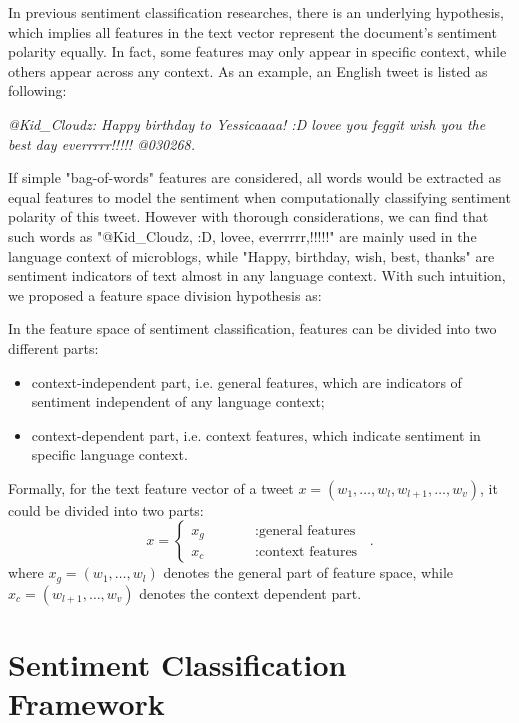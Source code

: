 \documentclass{llncs}
\begin{document}
In previous sentiment classification researches, there is an underlying hypothesis, which implies all features in the text vector represent the document’s sentiment polarity equally. 
In fact, some features may only appear in specific context, while others appear across any context. 
As an example, an English tweet is listed as following:

\textit{@Kid\_Cloudz: Happy birthday to Yessicaaaa! :D lovee you feggit wish you the best day everrrrr!!!!! @030268.}

If simple "bag-of-words" features are considered, all words would be extracted as equal features to model the sentiment when computationally classifying sentiment polarity of this tweet. 
However with thorough considerations, we can find that such words as "@Kid\_Cloudz, :D, lovee, everrrrr,!!!!!" are mainly used in the  language context of microblogs, while "Happy, birthday, wish, best, thanks" are sentiment indicators of text almost in any language context. 
With such intuition, we proposed a feature space division hypothesis as:
\begin{hypothesis}
\label{h1}
In the feature space of sentiment classification, features can be divided into two different parts:
\begin{itemize}
\item context-independent part, i.e. general features, which are indicators of sentiment independent of any language context;
\item context-dependent part, i.e. context features, which indicate sentiment in specific language context.
\end{itemize}
\end{hypothesis}
Formally, for the text feature vector of a tweet $ x=\left(  w_{1},\dots,w_{l},w_{l+1},\dots,w_{v} \right) $, it could be divided into two parts:
\begin{equation}
\label{e2}
x=\left\{
\begin{array}{rcl}
x_{g}     & \qquad        &:\mbox{general features}\\
x_{c}     &  \qquad       &:\mbox{context features}
\end{array}
\right. \enspace .
\end{equation}
where $ x_{g}= \left( w_{1},\dots,w_{l}\right) $ denotes the general part of feature space, while $ x_{c}= \left( w_{l+1},\dots,w_{v}\right) $ denotes the context dependent part.

\section{Sentiment Classification Framework}
\label{framework}
\end{document}
